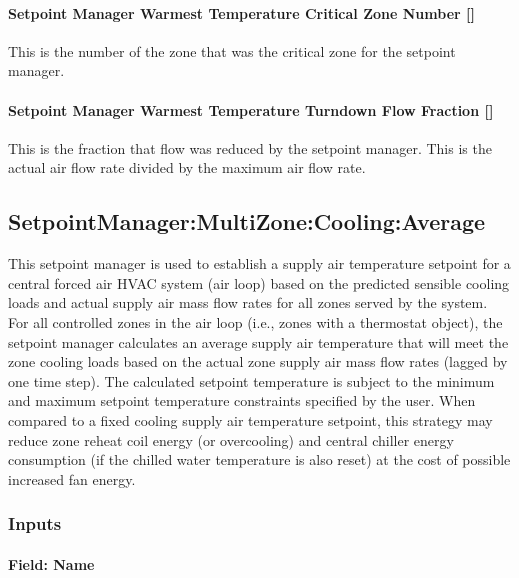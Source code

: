 \paragraph{Setpoint Manager Warmest Temperature Critical Zone Number {[]}}\label{setpoint-manager-warmest-temperature-critical-zone-number}

This is the number of the zone that was the critical zone for the setpoint manager.

\paragraph{Setpoint Manager Warmest Temperature Turndown Flow Fraction {[]}}\label{setpoint-manager-warmest-temperature-turndown-flow-fraction}

This is the fraction that flow was reduced by the setpoint manager. This is the actual air flow rate divided by the maximum air flow rate.

\subsection{SetpointManager:MultiZone:Cooling:Average}\label{setpointmanagermultizonecoolingaverage}

This setpoint manager is used to establish a supply air temperature setpoint for a central forced air HVAC system (air loop) based on the predicted sensible cooling loads and actual supply air mass flow rates for all zones served by the system. For all controlled zones in the air loop (i.e., zones with a thermostat object), the setpoint manager calculates an average supply air temperature that will meet the zone cooling loads based on the actual zone supply air mass flow rates (lagged by one time step). The calculated setpoint temperature is subject to the minimum and maximum setpoint temperature constraints specified by the user. When compared to a fixed cooling supply air temperature setpoint, this strategy may reduce zone reheat coil energy (or overcooling) and central chiller energy consumption (if the chilled water temperature is also reset) at the cost of possible increased fan energy.

\subsubsection{Inputs}\label{inputs-14-013}

\paragraph{Field: Name}\label{field-name-14-008}

